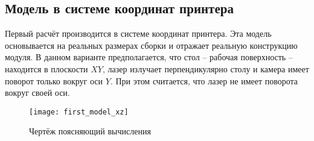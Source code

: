         \subsection{Модель в системе координат принтера}
            Первый расчёт производится в системе координат принтера. Эта модель основывается на реальных размерах сборки и отражает реальную конструкцию модуля. В данном варианте предполагается, что стол -- рабочая поверхность -- находится в плоскости $ XY $, лазер излучает перпендикулярно столу и камера имеет поворот только вокруг оси $ Y $. При этом считается, что лазер не имеет поворота вокруг своей оси.

            \begin{figure}[!ht]\label{pic:first_model}
                \centering
                \texttt{[image: first\_model\_xz]}
                \caption{Чертёж поясняющий вычисления}
            \end{figure}
            
